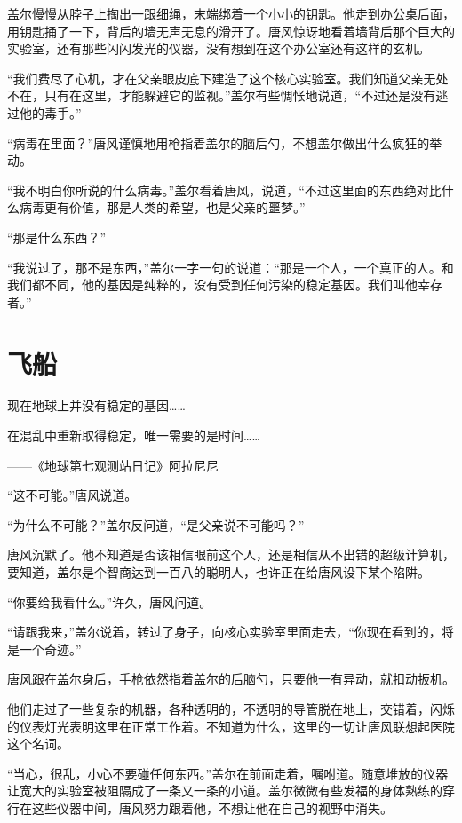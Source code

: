 盖尔慢慢从脖子上掏出一跟细绳，末端绑着一个小小的钥匙。他走到办公桌后面，用钥匙捅了一下，背后的墙无声无息的滑开了。唐风惊讶地看着墙背后那个巨大的实验室，还有那些闪闪发光的仪器，没有想到在这个办公室还有这样的玄机。

“我们费尽了心机，才在父亲眼皮底下建造了这个核心实验室。我们知道父亲无处不在，只有在这里，才能躲避它的监视。”盖尔有些惆怅地说道，“不过还是没有逃过他的毒手。”

“病毒在里面？”唐风谨慎地用枪指着盖尔的脑后勺，不想盖尔做出什么疯狂的举动。

“我不明白你所说的什么病毒。”盖尔看着唐风，说道，“不过这里面的东西绝对比什么病毒更有价值，那是人类的希望，也是父亲的噩梦。”

“那是什么东西？”

“我说过了，那不是东西，”盖尔一字一句的说道：“那是一个人，一个真正的人。和我们都不同，他的基因是纯粹的，没有受到任何污染的稳定基因。我们叫他幸存者。”

\chapter{飞船}

\begin{myquote}
现在地球上并没有稳定的基因……

在混乱中重新取得稳定，唯一需要的是时间……
\end{myquote}

\begin{myflushright}
——《地球第七观测站日记》阿拉尼尼
\end{myflushright}

“这不可能。”唐风说道。

“为什么不可能？”盖尔反问道，“是父亲说不可能吗？”

唐风沉默了。他不知道是否该相信眼前这个人，还是相信从不出错的超级计算机，要知道，盖尔是个智商达到一百八的聪明人，也许正在给唐风设下某个陷阱。

“你要给我看什么。”许久，唐风问道。

“请跟我来，”盖尔说着，转过了身子，向核心实验室里面走去，“你现在看到的，将是一个奇迹。”

唐风跟在盖尔身后，手枪依然指着盖尔的后脑勺，只要他一有异动，就扣动扳机。

他们走过了一些复杂的机器，各种透明的，不透明的导管脱在地上，交错着，闪烁的仪表灯光表明这里在正常工作着。不知道为什么，这里的一切让唐风联想起医院这个名词。

“当心，很乱，小心不要碰任何东西。”盖尔在前面走着，嘱咐道。随意堆放的仪器让宽大的实验室被阻隔成了一条又一条的小道。盖尔微微有些发福的身体熟练的穿行在这些仪器中间，唐风努力跟着他，不想让他在自己的视野中消失。

